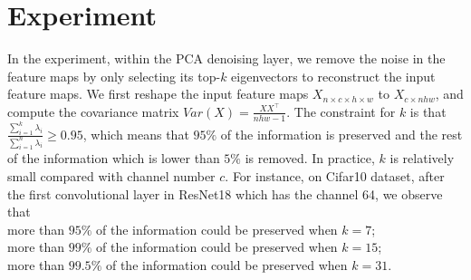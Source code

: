 \documentclass{article}
\begin{document}
\section{Experiment}

In the experiment, within the PCA denoising layer, we remove the noise in the feature maps by only selecting its top-$k$ eigenvectors to reconstruct the input feature maps.
We first reshape the input feature maps $X_{n {\times} c {\times} h {\times} w}$ to $X_{c {\times} nhw}$, and compute the covariance matrix $Var(X) =\frac{XX^{\top}}{nhw-1}$.
The constraint for $k$ is that $\frac{\sum_{i=1}^k\lambda_i}{\sum_{i=1}^n\lambda_i} \geq 0.95$, which means that $95\%$ of the information is preserved and the rest of the information which is lower than $5\%$ is removed. 
In practice, $k$ is relatively small compared with channel number $c$. For instance, on Cifar10 dataset, after the first convolutional layer in ResNet18 which has the channel 64, we observe that \\
more than $95\%$ of the information could be preserved when $k=7$; \\
more than $99\%$ of the information could be preserved when $k=15$; \\
more than $99.5\%$ of the information could be preserved when $k=31$. 

\end{document}
